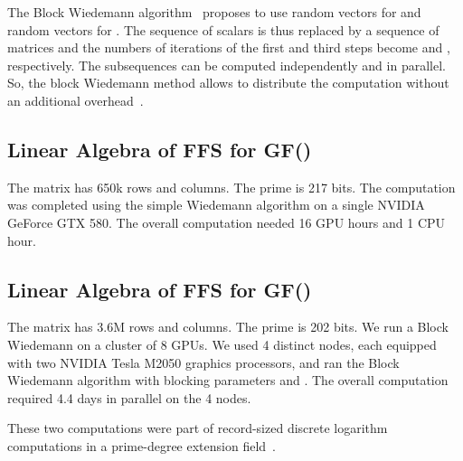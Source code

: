 \documentclass[runningheads,orivec]{llncs}
\begin{document}
The Block Wiedemann algorithm~\cite{KALT95} proposes to use  random vectors for  and  random vectors for . The sequence of scalars is thus replaced by a sequence of  matrices and the numbers of iterations of the first and third steps become  and , respectively. The  subsequences can be computed independently and in parallel. So, the block Wiedemann method allows to distribute the computation without an additional overhead~\cite{THOM02}. 

\subsection{Linear Algebra of FFS for GF()}
The matrix has 650k rows and columns. The prime  is 217 bits.
The computation was completed using the simple Wiedemann algorithm on a single NVIDIA GeForce GTX 580. The overall computation needed 16 GPU hours and 1 CPU hour. 

\subsection{Linear Algebra of FFS for GF()}
The matrix has 3.6M rows and columns. The prime  is 202 bits.
We run a Block Wiedemann on a cluster of 8 GPUs. We used 4 distinct nodes, each equipped with two NVIDIA Tesla M2050 graphics processors, and ran the Block Wiedemann algorithm with blocking parameters  and . The overall computation required 4.4 days in parallel on the 4 nodes.

\medskip 
These two computations were part of record-sized discrete logarithm computations in a prime-degree extension field~\cite{FFS809,JEL14}.
\end{document}
